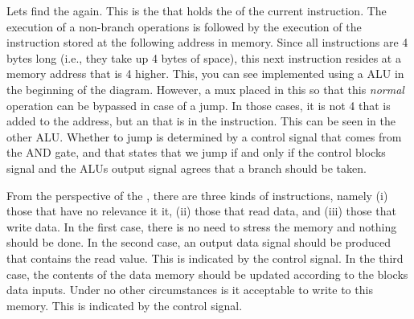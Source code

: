 Lets find the  again. This is the  that holds the  of the current instruction. The execution of a non-branch operations is followed by the execution of the instruction stored at the following address in memory. Since all instructions are 4 bytes long (i.e., they take up 4 bytes of space), this next instruction resides at a memory address that is 4 higher. This, you can see implemented using a \say{+} ALU in the beginning of the diagram. However, a mux placed in this so that this \textsl{normal} operation can be bypassed in case of a jump. In those cases, it is not 4 that is added to the address, but an  that is  in the instruction. This can be seen in the other \say{+} ALU. Whether to jump is determined by a control signal that comes from the AND gate, and that states that we jump if and only if the control blocks  signal and the ALUs output signal agrees that a branch should be taken.

From the perspective of the , there are three kinds of instructions, namely (i) those that have no relevance it it, (ii) those that read data, and (iii) those that write data. In the first case, there is no need to stress the memory and nothing should be done. In the second case, an output data signal should be produced that contains the read value. This is indicated by the  control signal. In the third case, the contents of the data memory should be updated according to the blocks data inputs. Under no other circumstances is it acceptable to write to this memory. This is indicated by the  control signal.

